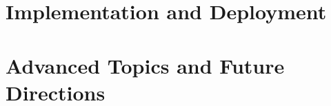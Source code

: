 \documentclass[11pt,openright,twoside,a4paper]{book}
\begin{document}
\part{Implementation and Deployment}


\part{Advanced Topics and Future Directions}



\backmatter


\printindex
\end{document}
